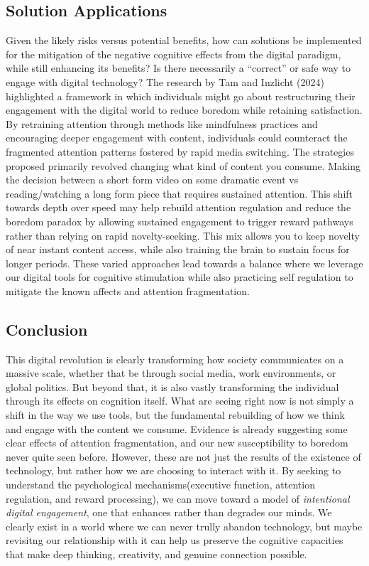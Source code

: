 \documentclass[12pt,letterpaper]{article}
\begin{document}
\subsection*{Solution Applications}

Given the likely risks versus potential benefits, how can solutions be implemented for the mitigation of the negative cognitive effects from the digital paradigm, while still enhancing its benefits? Is there necessarily a ``correct'' or safe way to engage with digital technology? The research by Tam and Inzlicht (2024) highlighted a framework in which individuals might go about restructuring their engagement with the digital world to reduce boredom while retaining satisfaction. By retraining attention through methods like mindfulness practices and encouraging deeper engagement with content, individuals could counteract the fragmented attention patterns fostered by rapid media switching. The strategies proposed primarily revolved changing what kind of content you consume. Making the decision between a short form video on some dramatic event vs reading/watching a long form piece that requires sustained attention. This shift towards depth over speed may help rebuild attention regulation and reduce the boredom paradox by allowing sustained engagement to trigger reward pathways rather than relying on rapid novelty-seeking. This mix allows you to keep novelty of near instant content access, while also training the brain to sustain focus for longer periods. These varied approaches lead towards a balance where we leverage our digital tools for cognitive stimulation while also practicing self regulation to mitigate the known affects and attention fragmentation.

\subsection*{Conclusion}

This digital revolution is clearly transforming how society communicates on a massive scale, whether that be through social media, work environments, or global politics. But beyond that, it is also vastly transforming the individual through its effects on cognition itself. What are seeing right now is not simply a shift in the way we use tools, but the fundamental rebuilding of how we think and engage with the content we consume. Evidence is already suggesting some clear effects of attention fragmentation, and our new susceptibility to boredom never quite seen before. However, these are not just the results of the existence of technology, but rather how we are choosing to interact with it. By seeking to understand the psychological mechanisms(executive function, attention regulation, and reward processing), we can move toward a model of \emph{intentional digital engagement}, one that enhances rather than degrades our minds. We clearly exist in a world where we can never trully abandon technology, but maybe revisitng our relationship with it can help us preserve the cognitive capacities that make deep thinking, creativity, and genuine connection possible.
\end{document}
